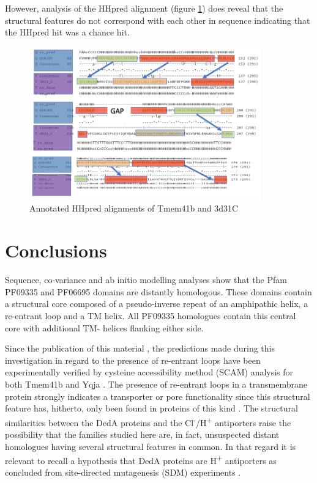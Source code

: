 However, analysis of the HHpred alignment (figure \ref{fig:abc_aln}) does reveal that the structural features do not correspond with each other in sequence indicating that the HHpred hit was a chance hit.

\begin{figure}[th!]
    \centering
    \includegraphics[width=100mm, scale =0.5]{Results/3d31c_aln.png}
    \caption{Annotated HHpred alignments of Tmem41b and 3d31C}
    \label{fig:abc_aln}
    \small
\end{figure}



\section{Conclusions}
Sequence, co-variance and ab initio modelling analyses show that the Pfam PF09335 and PF06695 domains are distantly homologous. These domains contain a structural core composed of a pseudo-inverse repeat of an amphipathic helix, a re-entrant loop and a TM helix. All PF09335 homologues contain this central core with additional TM- helices flanking either side.

Since the publication of this material \cite{mesdaghi2020silico}, the predictions made during this investigation in regard to the presence of re-entrant loops have been experimentally verified by cysteine accessibility method (SCAM) analysis for both Tmem41b \cite{okawa2021evolution} and Yqja \cite{scarsbrook2021topological}.  The presence of re-entrant loops in a transmembrane protein strongly indicates a transporter or pore functionality since this structural feature has, hitherto, only been found in proteins of this kind \cite{Yan2010} . The structural similarities between the DedA proteins and the Cl\textsuperscript{-}/H\textsuperscript{+} antiporters raise the possibility that the families studied here are, in fact, unsuspected distant homologues having several structural features in common. In that regard it is relevant to recall a hypothesis that DedA proteins are H\textsuperscript{+} antiporters as concluded from site-directed mutagenesis (SDM) experiments \cite{Kumar2014} \cite{Kumar2016}.

